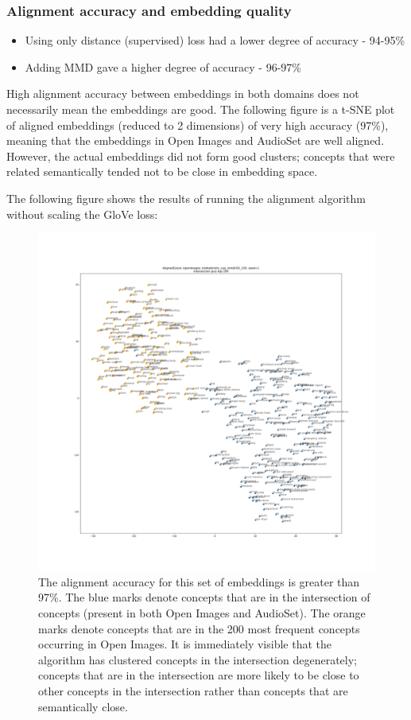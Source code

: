 \subsubsection{Alignment accuracy and embedding quality}

\begin{itemize}
    \item Using only distance (supervised) loss had a lower degree of accuracy - 94-95\% 
    \item Adding MMD gave a higher degree of accuracy - 96-97\%
\end{itemize}

High alignment accuracy between embeddings in both domains does not necessarily mean the embeddings are good. The following figure is a t-SNE plot of aligned embeddings (reduced to 2 dimensions) of very high accuracy (97\%), meaning that the embeddings in Open Images and AudioSet are well aligned. However, the actual embeddings did not form good clusters; concepts that were related semantically tended not to be close in embedding space. 

The following figure shows the results of running the alignment algorithm without scaling the GloVe loss:

\begin{figure}[H]
\label{fig:dysfunctional_clusters}
    \centering
    \includegraphics[width=1.10\textwidth]{images/method/probabilistic_aligned/dysfunctional_clusters.png}
    \caption{
        The alignment accuracy for this set of embeddings is greater than 97\%. The blue marks denote concepts that are in the intersection of concepts (present in both Open Images and AudioSet). The orange marks denote concepts that are in the 200 most frequent concepts occurring in Open Images. It is immediately visible that the algorithm has clustered concepts in the intersection degenerately; concepts that are in the intersection are more likely to be close to other concepts in the intersection rather than concepts that are semantically close.
    }
\end{figure}

